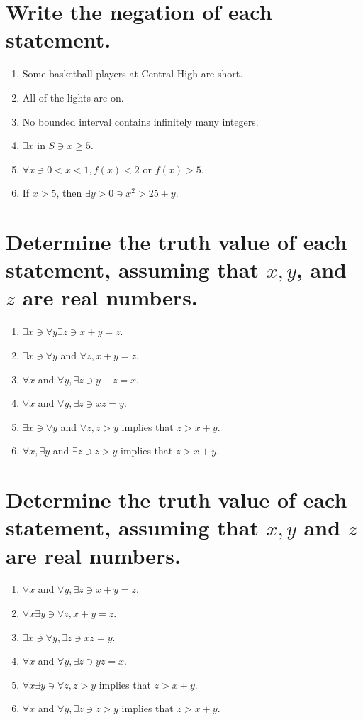 \documentclass[11pt]{article} %
\begin{document}
\section{Write the negation of each statement.}
\begin{enumerate}
\item Some basketball players at Central High are short.
\item All of the lights are on.
\item No bounded interval contains infinitely many integers.
\item $\exists x$ in $S \ni x \geq 5$.
\item $\forall x \ni 0 <x<1, f(x)<2$ or $ f(x)>5$.
\item If $x>5$, then $\exists y>0\ni x^2>25+y$.
\end{enumerate}

\section{Determine the truth value of each statement, assuming that $x,y$, and $z$ are real numbers.}
\begin{enumerate}
\item $\exists x\ni\forall y \exists z\ni x+y=z$.
\item $\exists x \ni\forall y$ and $\forall z, x+y=z$.
\item $\forall x$ and $\forall y,\exists z \ni y-z=x$.
\item $\forall x$ and $\forall y,\exists z \ni xz=y$.
\item $\exists x \ni \forall y$ and $\forall z, z>y$ implies that $z>x+y$.
\item $\forall x, \exists y$ and $\exists z \ni z>y$ implies that $z>x+y$.
\end{enumerate}

\section{Determine the truth value of each statement, assuming that $x,y$ and $z$ are real numbers.}
\begin{enumerate}
\item $\forall x$ and $\forall y, \exists z \ni x+y=z$.
\item $\forall x \exists y \ni \forall z, x+y=z$.
\item $\exists x \ni \forall y, \exists z \ni xz=y$.
\item $\forall x$ and $\forall y, \exists z \ni yz=x$.
\item $\forall x \exists y \ni \forall z, z>y$ implies that $ z>x+y$.
\item $\forall x$ and $\forall y, \exists z \ni z>y$ implies that $z>x+y$.
\end{enumerate}
\end{document}
